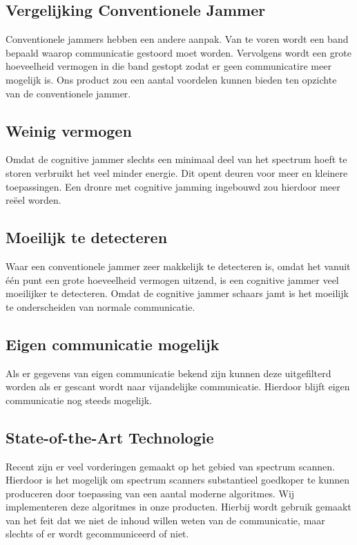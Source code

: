 \documentclass[oneside, a4paper, openany]{article}
\begin{document}
\subsection{Vergelijking Conventionele Jammer}
Conventionele jammers hebben een andere aanpak. Van te voren wordt een band bepaald waarop communicatie gestoord moet worden. Vervolgens wordt een grote hoeveelheid vermogen in die band gestopt zodat er geen communicatire meer mogelijk is. Ons product zou een aantal voordelen kunnen bieden ten opzichte van de conventionele jammer.

\subsection{Weinig vermogen}
Omdat de cognitive jammer slechts een minimaal deel van het spectrum hoeft te storen verbruikt het veel minder energie. Dit opent deuren voor meer en kleinere toepassingen. Een dronre met cognitive jamming ingebouwd zou hierdoor meer re\"eel worden.

\subsection{Moeilijk te detecteren}
Waar een conventionele jammer zeer makkelijk te detecteren is, omdat het vanuit \'e\'en punt een grote hoeveelheid vermogen uitzend, is een cognitive jammer veel moeilijker te detecteren. Omdat de cognitive jammer schaars jamt is het moeilijk te onderscheiden van normale communicatie.

\subsection{Eigen communicatie mogelijk}
Als er gegevens van eigen communicatie bekend zijn kunnen deze uitgefilterd worden als er gescant wordt naar vijandelijke communicatie. Hierdoor blijft eigen communicatie nog steeds mogelijk.

\subsection{State-of-the-Art Technologie}
Recent zijn er veel vorderingen gemaakt op het gebied van spectrum scannen. Hierdoor is het mogelijk om spectrum scanners substantieel goedkoper te kunnen produceren door toepassing van een aantal moderne algoritmes. Wij implementeren deze algoritmes in onze producten. Hierbij wordt gebruik gemaakt van het feit dat we niet de inhoud willen weten van de communicatie, maar slechts of er wordt gecommuniceerd of niet.
\end{document}
